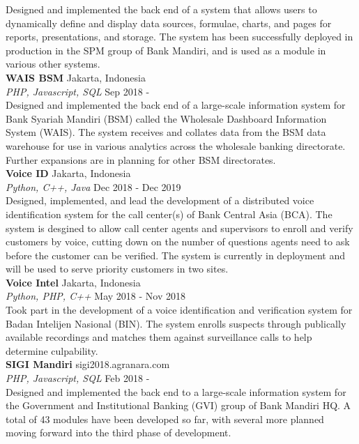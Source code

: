 \documentclass[a4paper]{article}
\begin{document}
\vspace*{1mm}
Designed and implemented the back end of a system that allows users to
dynamically define and display data sources, formulae, charts, and pages for
reports, presentations, and storage. The system has been successfully deployed
in production in the SPM group of Bank Mandiri, and is used as a module in
various other systems.\\
\vspace*{3mm}
{\textbf{WAIS BSM}} \hfill Jakarta, Indonesia \\
{\sl PHP, Javascript, SQL} \hfill Sep 2018 - \\
\vspace*{1mm}
Designed and implemented the back end of a large-scale information system for
Bank Syariah Mandiri (BSM) called the Wholesale Dashboard Information System
(WAIS). The system receives and collates data from the BSM data warehouse for
use in various analytics across the wholesale banking directorate. Further
expansions are in planning for other BSM directorates.\\
\vspace*{3mm}
{\textbf{Voice ID}} \hfill Jakarta, Indonesia \\
{\sl Python, C++, Java} \hfill Dec 2018 - Dec 2019 \\
\vspace*{1mm}
Designed, implemented, and lead the development of a distributed voice
identification system for the call center(s) of Bank Central Asia (BCA).
The system is desgined to allow call center agents and supervisors to enroll
and verify customers by voice, cutting down on the number of questions agents
need to ask before the customer can be verified. The system is currently in deployment and will be used to serve priority customers in two sites.\\
\vspace*{3mm}
{\textbf{Voice Intel}} \hfill Jakarta, Indonesia \\
{\sl Python, PHP, C++} \hfill May 2018 - Nov 2018 \\
\vspace*{1mm}
Took part in the development of a voice identification and verification system
for Badan Intelijen Nasional (BIN). The system enrolls suspects through
publically available recordings and matches them against surveillance calls to
help determine culpability.\\
\vspace*{3mm}
{\textbf{SIGI Mandiri}}  \hfill sigi2018.agranara.com\\
{\sl PHP, Javascript, SQL} \hfill Feb 2018 - \\
\vspace*{1mm}
Designed and implemented the back end to a large-scale information system for
the Government and Institutional Banking (GVI) group of Bank Mandiri HQ. A
total of 43 modules have been developed so far, with several more planned
moving forward into the third phase of development.\\
\vspace*{3mm}
\end{document}
